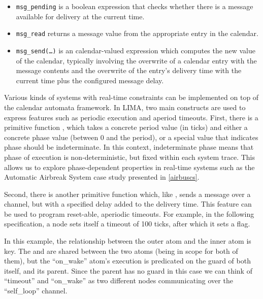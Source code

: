 \begin{itemize}
    \item \texttt{msg\_pending} is a boolean expression that checks whether
        there is a message available for delivery at the current time.
    \item \texttt{msg\_read} returns a message value from the appropriate
        entry in the calendar.
    \item \texttt{msg\_send(\ldots)} is an calendar-valued expression which
        computes the new value of the calendar, typically involving the
        overwrite of a calendar entry with the message contents and the overwrite
        of the entry's delivery time with the current time plus the configured
        message delay.
\end{itemize}

Various kinds of systems with real-time constraints can be implemented
on top of the calendar automata framework. In LIMA, two main
constructs are used to express features such as periodic execution
and aperiod timeouts. First, there is a primitive function ,
which takes a concrete period value (in ticks) and either a concrete
phase value (between 0 and the period), or a special value that
indicates phase should be indeterminate. In this context, indeterminate
phase means that phase of execution is non-deterministic, but fixed
within each system trace. This allows us to explore phase-dependent properties
in real-time systems such as the Automatic Airbreak System case study presented in
\ref{airbuscs}.

Second, there is another primitive function  which,
like , sends a message over a channel, but with a specified
delay added to the delivery time. This feature can be used to program
reset-able, aperiodic timeouts. For example, in the following specification, a
node sets itself a timeout of 100 ticks, after which it sets a flag.


In this example, the relationship between the
outer atom and the inner atom is key. The  and  are shared between
the two atoms (being in scope for both of them), but the ``on\_wake'' atom's
execution is predicated on the guard of both itself, and its parent. Since
the parent has no guard in this case we can think of ``timeout'' and
``on\_wake'' as two different nodes communicating over the ``self\_loop''
channel.

